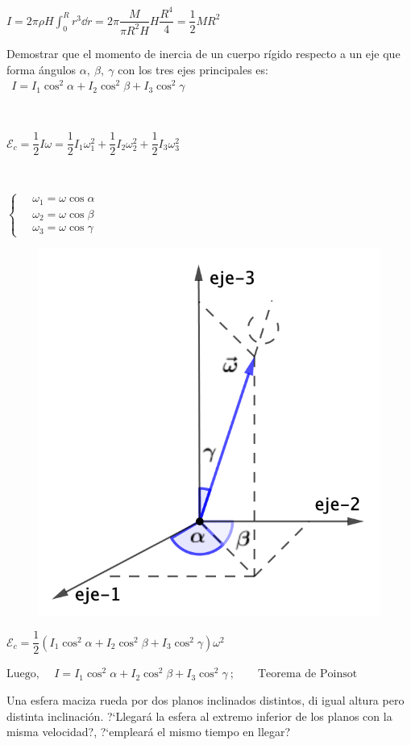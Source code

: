 $\displaystyle I=2\pi \rho  H \int_0^R r^3 \dd r = 2 \pi \dfrac{M}{\pi R^2 H}H \dfrac{R^4}{4}=\dfrac 1 2 M R^2$

\begin{prob}
Demostrar que el momento de inercia	de un cuerpo rígido respecto a un eje que forma ángulos $\alpha,\ \beta,\ \gamma$ con los tres ejes principales es:
$\ \ I=I_1 \cos^2 \alpha + I_2 \cos^2 \beta + I_3 \cos^2 \gamma$
\end{prob}
\begin{multicols}{2}
$\quad$

$\mathcal E_c=\dfrac 1 2 I\omega = \dfrac 1 2 I_1 \omega_1^2+\dfrac 1 2 I_2 \omega_2^2+\dfrac 1 2 I_3 \omega_3^2$

$\quad$

$\begin{cases}
\quad \omega_1=\omega \cos \alpha \\
\quad\omega_2=\omega \cos \beta \\
\quad \omega_3=\omega \cos \gamma
\end{cases}$

\begin{figure}[H]
	\centering
	\includegraphics[width=.3\textwidth]{imagenes/imagenes16/T16IM23.png}
\end{figure}	
\end{multicols}
\vspace{-3mm} %
$\mathcal E_c=\dfrac 1 2 \left( I_1 \cos^2 \alpha + I_2 \cos^2 \beta + I_3 \cos^2 \gamma \right)\omega^2$

$\text{Luego, } \quad   I=I_1 \cos^2 \alpha + I_2 \cos^2 \beta + I_3 \cos^2 \gamma \ ; \qquad \text{Teorema de Poinsot}$

\begin{prob}
Una esfera maciza rueda por dos planos inclinados distintos, di igual altura pero distinta inclinación.	?`Llegará la esfera al extremo inferior de los planos con la misma velocidad?, ?`empleará el mismo tiempo en llegar?
\end{prob}

